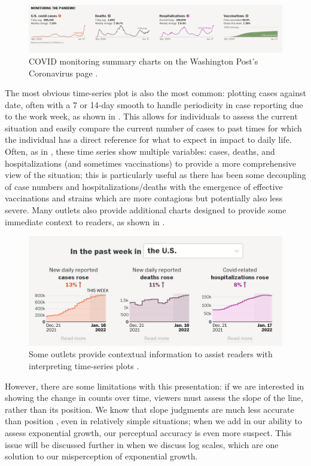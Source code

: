\documentclass[article]{jdssv}\usepackage[]{graphicx}\usepackage[]{xcolor}
\begin{document}
\begin{figure}
\centering
\includegraphics[width=.99\linewidth]{wapo-covid-monitoring}
\caption{COVID monitoring summary charts on the Washington Post's Coronavirus page \citep{Coronavirus2022}.}
\label{fig:wapo-covid-time-series}
\end{figure}

The most obvious time-series plot is also the most common: plotting cases against date, often with a 7 or 14-day smooth to handle periodicity in case reporting due to the work week, as shown in . This allows for individuals to assess the current situation and easily compare the current number of cases to past times for which the individual has a direct reference for what to expect in impact to daily life. Often, as in , these time series show multiple variables: cases, deaths, and hospitalizations (and sometimes vaccinations) to provide a more comprehensive view of the situation; this is particularly useful as there has been some decoupling of case numbers and hospitalizations/deaths with the emergence of effective vaccinations and strains which are more contagious but potentially also less severe. Many outlets also provide additional charts designed to provide some immediate context to readers, as shown in . 

\begin{figure}
\centering
\includegraphics[width=.5\linewidth]{wapo-covid-context}
\caption{Some outlets provide contextual information to assist readers with interpreting time-series plots \citep{CoronavirusCasesTracking2022}.}
\label{fig:wapo-context}
\end{figure}

However, there are some limitations with this presentation: if we are interested in showing the change in counts over time, viewers must assess the slope of the line, rather than its position. We know that slope judgments are much less accurate than position \citep{clevelandGraphicalPerceptionVisual1987}, even in relatively simple situations; when we add in our ability to assess exponential growth, our perceptual accuracy is even more suspect. This issue will be discussed further in  when we discuss log scales, which are one solution to our misperception of exponential growth.
\end{document}

